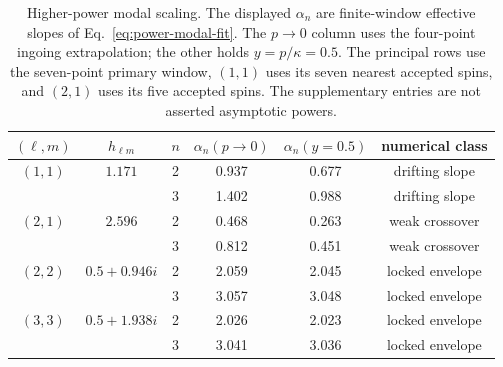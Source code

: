 \documentclass[aps,prd,twocolumn,10pt,nofootinbib,superscriptaddress,floatfix]{revtex4-2}
\begin{document}
\begin{table}[t]
\caption{Higher-power modal scaling.  The displayed $\alpha_n$ are
finite-window effective slopes
of Eq.~\eqref{eq:power-modal-fit}.  The $p\to0$ column uses the four-point
ingoing extrapolation; the other holds $y=p/\kappa=0.5$.  The principal rows
use the seven-point primary window, $(1,1)$ uses its seven nearest accepted
spins, and $(2,1)$ uses its five accepted spins.  The supplementary entries
are not asserted asymptotic powers.}
\label{tab:power-modal}
\begin{ruledtabular}
\begin{tabular}{c c c c c c}
$(\ell,m)$ & $h_{\ell m}$ & $n$ & $\alpha_n(p\to0)$
& $\alpha_n(y=0.5)$ & numerical class\\
\hline
$(1,1)$ & $1.171$ & 2 & 0.937 & 0.677 & drifting slope\\
        &         & 3 & 1.402 & 0.988 & drifting slope\\
$(2,1)$ & $2.596$ & 2 & 0.468 & 0.263 & weak crossover\\
        &         & 3 & 0.812 & 0.451 & weak crossover\\
$(2,2)$ & $0.5+0.946i$ & 2 & 2.059 & 2.045 & locked envelope\\
        &              & 3 & 3.057 & 3.048 & locked envelope\\
$(3,3)$ & $0.5+1.938i$ & 2 & 2.026 & 2.023 & locked envelope\\
        &              & 3 & 3.041 & 3.036 & locked envelope\\
\end{tabular}
\end{ruledtabular}
\end{table}
\end{document}
